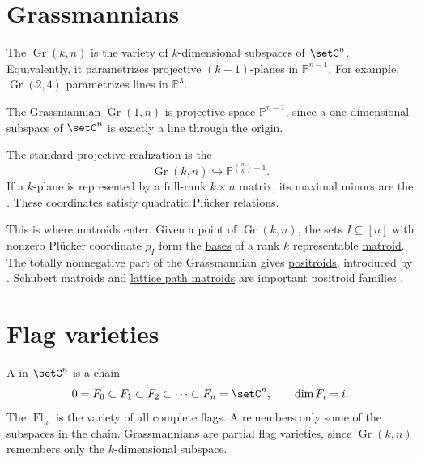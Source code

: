 \section[grassmannianVarieties]{Grassmannians}

The \label{grassmannianVarietyDefinition}
$\operatorname{Gr}(k,n)$ is the variety of $k$-dimensional subspaces of
$\setC^n$.  Equivalently, it parametrizes projective $(k-1)$-planes in
$\mathbb P^{n-1}$.  For example, $\operatorname{Gr}(2,4)$ parametrizes lines
in $\mathbb P^3$.

\begin{example}
The Grassmannian $\operatorname{Gr}(1,n)$ is projective space
$\mathbb P^{n-1}$, since a one-dimensional subspace of $\setC^n$ is exactly
a line through the origin.
\end{example}

The standard projective realization is the
\label{pluckerEmbedding}
\[
  \operatorname{Gr}(k,n)\hookrightarrow \mathbb P^{\binom nk-1}.
\]
If a $k$-plane is represented by a full-rank $k\times n$ matrix, its maximal
minors are the \label{pluckerCoordinate}.  These
coordinates satisfy quadratic Plücker relations.

This is where matroids enter.  Given a point of $\operatorname{Gr}(k,n)$, the
sets $I\subseteq[n]$ with nonzero Plücker coordinate $p_I$ form the
\hyperref[matroidBasis]{bases} of a rank $k$ representable
\hyperref[matroidDefinition]{matroid}.  The totally nonnegative part of the
Grassmannian gives \hyperref[positroid]{positroids}, introduced by
 \cite{Postnikov2006x}.  Schubert matroids and
\hyperref[latticePathMatroidDefinition]{lattice path matroids} are important
positroid families \cite{Oh2011}.


\section[flagVarieties]{Flag varieties}

A \label{completeFlagDefinition} in $\setC^n$ is a chain
\[
  0=F_0\subset F_1\subset F_2\subset\dotsb\subset F_n=\setC^n,
  \qquad \dim F_i=i.
\]
The \label{flagVarietyDefinition} $\operatorname{Fl}_n$ is
the variety of all complete flags.  A
\label{partialFlagVarietyDefinition} remembers only
some of the subspaces in the chain.  Grassmannians are partial flag varieties,
since
$\operatorname{Gr}(k,n)$ remembers only the $k$-dimensional subspace.

